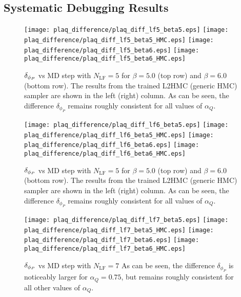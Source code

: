 \documentclass[../main.tex]{subfiles}
\begin{document}
\subsection{Systematic Debugging Results}%
\label{subsec:debugging_results}
\begin{figure}[htpb]\label{fig:plaq_diff_plots_lf5}
  \texttt{[image: plaq\_difference/plaq\_diff\_lf5\_beta5.eps]}
  \hfill
  \texttt{[image: plaq\_difference/plaq\_diff\_lf5\_beta5\_HMC.eps]}
  \texttt{[image: plaq\_difference/plaq\_diff\_lf5\_beta6.eps]}
  \hfill
  \texttt{[image: plaq\_difference/plaq\_diff\_lf5\_beta6\_HMC.eps]}
  \caption{${\delta_{\phi_{P}}}$ vs MD step with $N_{\mathrm{LF}} = 5$ for $\beta = 5.0$ (top row) and $\beta = 6.0$ (bottom
    row). The results from the trained L2HMC (generic HMC) sampler are shown in the left (right) column. As can be seen,
    the difference $\delta_{\phi_{P}}$ remains roughly consistent for all values of $\alpha_Q$.}
\end{figure}
%
\begin{figure}[htpb]\label{fig:plaq_diff_plots_lf6}
  \texttt{[image: plaq\_difference/plaq\_diff\_lf6\_beta5.eps]}
  \hfill
  \texttt{[image: plaq\_difference/plaq\_diff\_lf6\_beta5\_HMC.eps]}
  \texttt{[image: plaq\_difference/plaq\_diff\_lf6\_beta6.eps]}
  \hfill
  \texttt{[image: plaq\_difference/plaq\_diff\_lf6\_beta6\_HMC.eps]}
  \caption{${\delta_{\phi_{P}}}$ vs MD step with $N_{\mathrm{LF}} = 5$ for $\beta = 5.0$ (top row) and $\beta = 6.0$ (bottom
    row). The results from the trained L2HMC (generic HMC) sampler are shown in the left (right) column. As can be seen,
    the difference $\delta_{\phi_{P}}$ remains roughly consistent for all values of $\alpha_Q$.}
\end{figure}
%
\begin{figure}[htpb]\label{fig:plaq_diff_plots_lf7}
  \texttt{[image: plaq\_difference/plaq\_diff\_lf7\_beta5.eps]}
  \hfill
  \texttt{[image: plaq\_difference/plaq\_diff\_lf7\_beta5\_HMC.eps]}
  \texttt{[image: plaq\_difference/plaq\_diff\_lf7\_beta6.eps]}
  \hfill
  \texttt{[image: plaq\_difference/plaq\_diff\_lf7\_beta6\_HMC.eps]}
  \caption{${\delta_{\phi_{P}}}$ vs MD step with $N_{\mathrm{LF}} = 7$ As can be seen, the difference $\delta_{\phi_{P}}$ is
    noticeably larger for $\alpha_Q = 0.75$, but remains roughly consistent for all other values of $\alpha_Q$.}
\end{figure}
\end{document}
